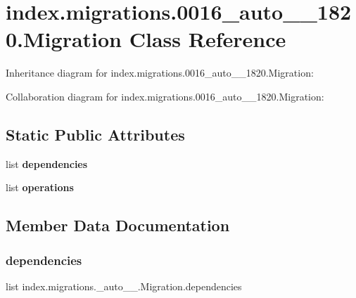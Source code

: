 \hypertarget{classindex_1_1migrations_1_10016__auto__20171024__1820_1_1Migration}{}\section{index.\+migrations.0016\+\_\+auto\+\_\+\_\+1820.Migration Class Reference}
\label{classindex_1_1migrations_1_10016__auto__20171024__1820_1_1Migration}


Inheritance diagram for index.\+migrations.0016\+\_\+auto\+\_\+\_\+1820.Migration\+:


Collaboration diagram for index.\+migrations.0016\+\_\+auto\+\_\+\_\+1820.Migration\+:
\subsection*{Static Public Attributes}
\begin{DoxyCompactItemize}
\item 
list {\bfseries dependencies}
\item 
\mbox{\label{classindex_1_1migrations_1_10016__auto__20171024__1820_1_1Migration_aebe051cb13446e2bb7447692ddf684f8}} 
list {\bfseries operations}
\end{DoxyCompactItemize}


\subsection{Member Data Documentation}
\mbox{\label{classindex_1_1migrations_1_10016__auto__20171024__1820_1_1Migration_aa359d31f0b8804e4c7a89f492d1b893e}} 
\subsubsection{\texorpdfstring{dependencies}{dependencies}}
{\footnotesize\ttfamily list index.\+migrations.\+\_\+auto\+\_\+\_.\+Migration.\+dependencies\hspace{0.3cm}{\ttfamily [static]}}

